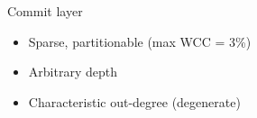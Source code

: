 \documentclass[aspectratio=169,xcolor=table]{beamer}
\begin{document}
\begin{frame}
\begin{columns}
            \begin{block}{Commit layer}
                \begin{itemize}
                    \item Sparse, partitionable (max WCC = 3\%)
                    \item Arbitrary depth
                    \item Characteristic out-degree (degenerate)
                \end{itemize}
                \begin{center}
                    \scalebox{0.5}{}
                \end{center}
            \end{block}
        \end{columns}
    \end{frame}
\end{document}
